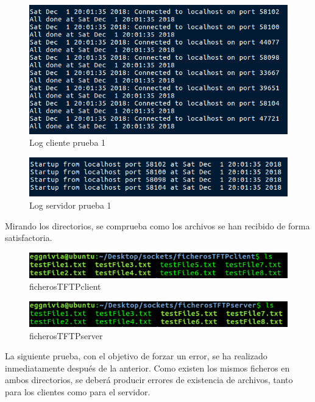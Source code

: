 \documentclass[journal, a4paper]{IEEEtran}
\begin{document}
\begin{figure}[H]
\centering
\includegraphics[scale=0.55]{images/log_cliente_prueba_1}
\caption{Log cliente prueba 1}
\end{figure}

\begin{figure}[H]
\centering
\includegraphics[scale=0.6]{images/log_server_prueba_1}
\caption{Log servidor prueba 1}
\end{figure}

Mirando los directorios, se comprueba como los archivos se han recibido de forma satisfactoria.

\begin{figure}[H]
\centering
\includegraphics[scale=0.6]{images/client_after_1}
\caption{ficherosTFTPclient}
\end{figure}

\begin{figure}[H]
\centering
\includegraphics[scale=0.6]{images/server_after_1}
\caption{ficherosTFTPserver}
\end{figure}

La siguiente prueba, con el objetivo de forzar un error, se ha realizado inmediatamente después de la anterior. Como existen los mismos ficheros en ambos directorios, se deberá producir errores de existencia de archivos, tanto para los clientes como para el servidor.
\end{document}
